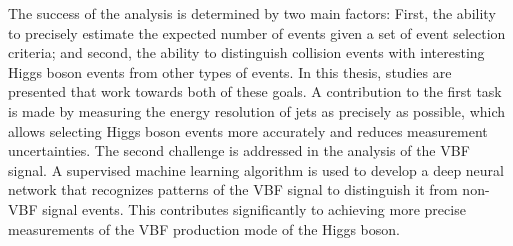 The success of the \HWW analysis is determined by two main factors: 
First, the ability to precisely estimate the expected number of events given a set of event selection criteria; and second, the ability to distinguish collision events with interesting Higgs boson events from other types of events.
In this thesis, studies are presented that work towards both of these goals.
A contribution to the first task is made by measuring the energy resolution of jets as precisely as possible, which allows selecting Higgs boson events more accurately and reduces measurement uncertainties.
The second challenge is addressed in the analysis of the VBF signal.
A supervised machine learning algorithm is used to develop a deep neural network that recognizes patterns of the VBF signal to distinguish it from non-VBF signal events.
This contributes significantly to achieving more precise measurements of the VBF production mode of the Higgs boson.




